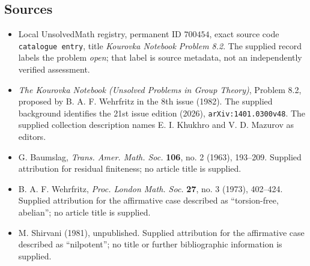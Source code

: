 \documentclass[11pt]{article}
\begin{document}
\subsection{Sources}
\begin{itemize}
\item Local UnsolvedMath registry, permanent ID \(700454\), exact source code \texttt{catalogue entry}, title \emph{Kourovka Notebook Problem 8.2}. The supplied record labels the problem \emph{open}; that label is source metadata, not an independently verified assessment.
\item \emph{The Kourovka Notebook (Unsolved Problems in Group Theory)}, Problem 8.2, proposed by B. A. F. Wehrfritz in the 8th issue (1982). The supplied background identifies the 21st issue edition (2026), \texttt{arXiv:1401.0300v48}. The supplied collection description names E. I. Khukhro and V. D. Mazurov as editors.
\item G. Baumslag, \emph{Trans. Amer. Math. Soc.} \textbf{106}, no. 2 (1963), 193--209. Supplied attribution for residual finiteness; no article title is supplied.
\item B. A. F. Wehrfritz, \emph{Proc. London Math. Soc.} \textbf{27}, no. 3 (1973), 402--424. Supplied attribution for the affirmative case described as ``torsion-free, abelian''; no article title is supplied.
\item M. Shirvani (1981), unpublished. Supplied attribution for the affirmative case described as ``nilpotent''; no title or further bibliographic information is supplied.
\end{itemize}
\end{document}
